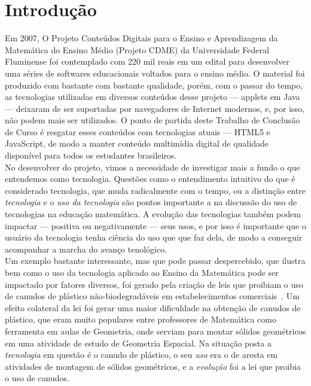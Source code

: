 \chapter{Introdução}
\label{cap:introducao}

Em 2007, O Projeto Conteúdos Digitais para o Ensino e Aprendizagem da Matemática do Ensino Médio (Projeto CDME) da Universidade Federal Fluminense foi contemplado com 220 mil reais em um edital para desenvolver uma séries de softwares educacionais voltados para o ensino médio. O material foi produzido com bastante com bastante qualidade, porém, com o passar do tempo, as tecnologias utilizadas em diversos conteúdos desse projeto --- applets em Java --- deixaram de ser suportadas por navegadores de Internet modernos, e, por isso, não podem mais ser utilizados. O ponto de partida deste Trabalho de Conclusão de Curso é resgatar esses conteúdos com tecnologias atuais --- HTML5 e JavaScript, de modo a manter conteúdo multimídia digital de qualidade disponível para todos os estudantes brasileiros. 
\\


No desenvolver do projeto, vimos a necessidade de investigar mais a fundo o que entendemos como tecnologia. Questões como o entendimento intuitivo do que é considerado tecnologia, que muda radicalmente com o tempo, ou a distinção entre \textit{tecnologia} e o \textit{uso da tecnologia} são pontos importante a na discussão do uso de tecnologias na educação matemática. A evolução das tecnologias também podem impactar --- positiva ou negativamente --- seus usos, e por isso é importante que o usuário da tecnologia tenha ciência do uso que que faz dela, de modo a conseguir acompanhar a marcha do avanço tenológico. 
\\

Um exemplo bastante interessante, mas que pode passar despercebido, que ilustra bem como o uso da tecnologia aplicado ao Ensino da Matemática pode ser impactado por fatores diversos, foi gerado pela criação de leis que proibiam o uso de canudos de plástico não-biodegradáveis em estabelecimentos comerciais~\cite{leicanudos}. Um efeito colateral da lei foi gerar uma maior dificuldade na obtenção de canudos de plástico, que eram muito populares entre professores de Matemática como ferramenta em aulas de Geometria, onde serviam para montar sólidos geométricos em uma atividade de estudo de Geometria Espacial. Na situação posta a \textit{tecnologia} em questão é o canudo de plástico, o seu \textit{uso} era o de aresta em atividades de montagem de sólidos geométricos, e a \textit{evolução} foi a lei que proibia o uso de canudos.
\\

